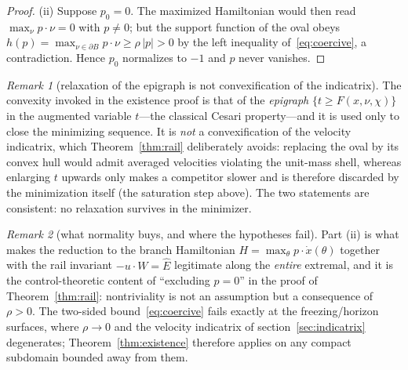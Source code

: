 \documentclass[12pt]{iopart}
\newcommand{\Ehat}{\hat E}
\theoremstyle{plain}
\theoremstyle{definition}
\theoremstyle{plain}
\theoremstyle{remark}
\newtheorem*{remark}{Remark}
\begin{document}
\begin{proof}
(ii) Suppose $p_0=0$. The maximized Hamiltonian would then read $\max_\nu p\cdot\nu=0$
with $p\neq0$; but the support function of the oval obeys
$h(p)=\max_{\nu\in\partial B}p\cdot\nu\ge\rho\,|p|>0$ by the left inequality
of~\eqref{eq:coercive}, a contradiction. Hence $p_0$ normalizes to $-1$ and $p$ never
vanishes.
\end{proof}

\begin{remark}[relaxation of the epigraph is not convexification of the indicatrix]
\label{rem:no-convexification}
The convexity invoked in the existence proof is that of the \emph{epigraph}
$\{t\ge F(x,\nu,\chi)\}$ in the augmented variable $t$---the classical Cesari property---and
it is used only to close the minimizing sequence. It is \emph{not} a convexification of the
velocity indicatrix, which Theorem~\ref{thm:rail} deliberately avoids: replacing the oval
by its convex hull would admit averaged velocities violating the unit-mass shell, whereas
enlarging $t$ upwards only makes a competitor slower and is therefore discarded by the
minimization itself (the saturation step above). The two statements are consistent: no
relaxation survives in the minimizer.
\end{remark}

\begin{remark}[what normality buys, and where the hypotheses fail]
Part (ii) is what makes the reduction to the branch Hamiltonian
$H=\max_\theta p\cdot\dot x(\theta)$ together with the rail invariant $-u\cdot W=\Ehat$
legitimate along the \emph{entire} extremal, and it is the control-theoretic content of
``excluding $p=0$'' in the proof of Theorem~\ref{thm:rail}: nontriviality is not an
assumption but a consequence of $\rho>0$. The two-sided bound~\eqref{eq:coercive} fails
exactly at the freezing/horizon surfaces, where $\rho\to0$ and the velocity indicatrix of
section~\ref{sec:indicatrix} degenerates; Theorem~\ref{thm:existence} therefore applies on
any compact subdomain bounded away from them.
\end{remark}
\end{document}
